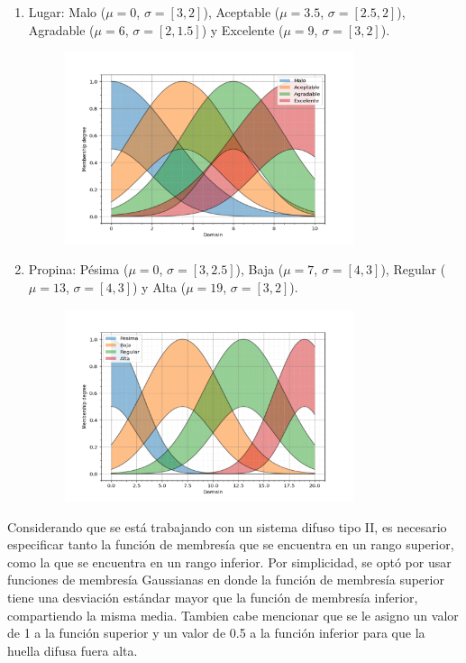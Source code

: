\documentclass[11pt, letterpaper]{article}
\begin{document}
\begin{enumerate}
	\item Lugar: Malo ($\mu = 0$, $\sigma = [3,2]$), Aceptable ($\mu = 3.5$, $\sigma = [2.5,2]$), Agradable ($\mu = 6$, $\sigma = [2,1.5]$) y Excelente ($\mu = 9$, $\sigma = [3,2]$).
\begin{figure}[h]
	\centering
	\includegraphics[width=0.8\textwidth]{IMG/P13.png}
\end{figure}

	\newpage
	
	\item Propina: Pésima ($\mu = 0$, $\sigma = [3,2.5]$), Baja ($\mu = 7$, $\sigma = [4, 3]$), Regular ($\mu = 13$, $\sigma = [4,3]$) y Alta ($\mu = 19$, $\sigma = [3,2]$).
	\begin{figure}[h]
		\centering
		\includegraphics[width=0.8\textwidth]{IMG/P14.png}
	\end{figure}
\end{enumerate}

Considerando que se está trabajando con un sistema difuso tipo II, es necesario especificar tanto la función de membresía que se encuentra en un rango superior, como la que se encuentra en un rango inferior. Por simplicidad, se optó por usar funciones de membresía Gaussianas en donde la función de membresía superior tiene una desviación estándar mayor que la función de membresía inferior, compartiendo la misma media. Tambien cabe mencionar que se le asigno un valor de 1 a la función superior y un valor de 0.5 a la función inferior para que la huella difusa fuera alta.
\end{document}
